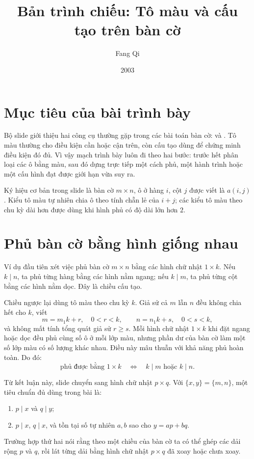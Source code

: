\documentclass[11pt]{article}
\title{Bản trình chiếu: Tô màu và cấu tạo trên bàn cờ}
\author{Fang Qi}
\date{2003}
\begin{document}
\maketitle


\section{Mục tiêu của bài trình bày}

Bộ slide giới thiệu hai công cụ thường gặp trong các bài toán bàn cờ:
 và . Tô màu thường cho
điều kiện cần hoặc cận trên, còn cấu tạo dùng để chứng minh điều kiện đó đủ.
Vì vậy mạch trình bày luôn đi theo hai bước: trước hết phân loại các ô bằng
màu, sau đó dựng trực tiếp một cách phủ, một hành trình hoặc một cấu hình đạt
được giới hạn vừa suy ra.

Ký hiệu cơ bản trong slide là bàn cờ \(m\times n\), ô ở hàng \(i\), cột \(j\)
được viết là \(a(i,j)\). Kiểu tô màu tự nhiên chia ô theo tính chẵn lẻ của
\(i+j\); các kiểu tô màu theo chu kỳ dài hơn được dùng khi hình phủ có độ dài
lớn hơn \(2\).

\section{Phủ bàn cờ bằng hình giống nhau}

Ví dụ đầu tiên xét việc phủ bàn cờ \(m\times n\) bằng các hình chữ nhật
\(1\times k\). Nếu \(k\mid n\), ta phủ từng hàng bằng các hình nằm ngang; nếu
\(k\mid m\), ta phủ từng cột bằng các hình nằm dọc. Đây là chiều cấu tạo.

Chiều ngược lại dùng tô màu theo chu kỳ \(k\). Giả sử cả \(m\) lẫn \(n\) đều
không chia hết cho \(k\), viết
\[
  m=m_1k+r,\quad 0<r<k,\qquad
  n=n_1k+s,\quad 0<s<k,
\]
và không mất tính tổng quát giả sử \(r\ge s\). Mỗi hình chữ nhật \(1\times k\)
khi đặt ngang hoặc dọc đều phủ cùng số ô ở mỗi lớp màu, nhưng phần dư của bàn
cờ làm một số lớp màu có số lượng khác nhau. Điều này mâu thuẫn với khả năng
phủ hoàn toàn. Do đó:
\[
  \text{phủ được bằng }1\times k
  \quad\Longleftrightarrow\quad
  k\mid m \text{ hoặc } k\mid n.
\]

Từ kết luận này, slide chuyển sang hình chữ nhật \(p\times q\). Với
\(\{x,y\}=\{m,n\}\), một tiêu chuẩn đủ dùng trong bài là:
\begin{enumerate}
  \item \(p\mid x\) và \(q\mid y\);
  \item \(p\mid x\), \(q\mid x\), và tồn tại số tự nhiên \(a,b\) sao cho
        \(y=ap+bq\).
\end{enumerate}
Trường hợp thứ hai nói rằng theo một chiều của bàn cờ ta có thể ghép các dải
rộng \(p\) và \(q\), rồi lát từng dải bằng hình chữ nhật \(p\times q\) đã
xoay hoặc chưa xoay.
\end{document}

